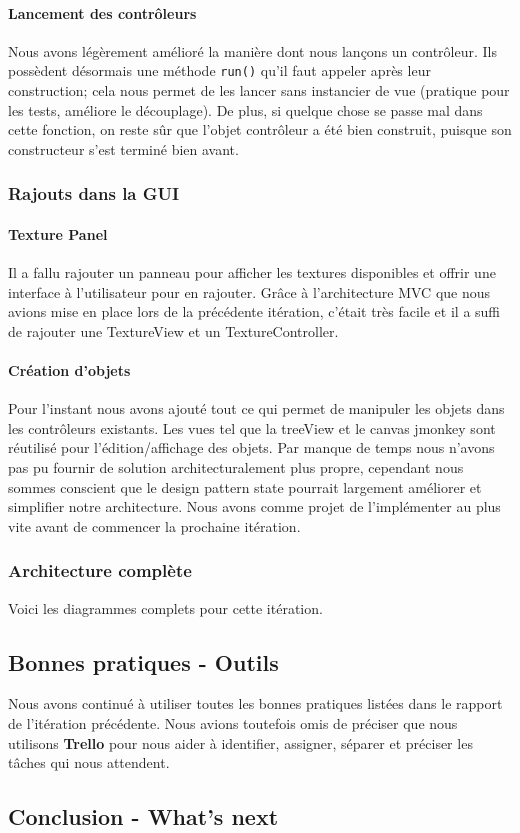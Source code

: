 		\paragraph{Lancement des contrôleurs}
		Nous avons légèrement amélioré la manière dont nous lançons un contrôleur.
		Ils possèdent désormais une méthode \texttt{run()} qu'il faut appeler
		après leur construction; cela nous permet de les lancer sans instancier
		de vue (pratique pour les tests, améliore le découplage). De plus, si 
		quelque chose se passe mal dans cette fonction, on reste sûr que 
		l'objet contrôleur a été bien construit, puisque son constructeur s'est
		terminé bien avant. 

	\subsubsection{Rajouts dans la GUI}

		\paragraph{Texture Panel}
		Il a fallu rajouter un panneau pour afficher les textures disponibles et
		offrir une interface à l'utilisateur pour en rajouter. Grâce à 
		l'architecture MVC que nous avions mise en place lors de la précédente 
		itération, c'était très facile et il a suffi de rajouter une TextureView
		et un TextureController.

		\paragraph{Création d'objets}
		Pour l'instant nous avons ajouté tout ce qui permet de manipuler les objets dans les contrôleurs existants. Les vues tel que la treeView et le canvas jmonkey sont réutilisé pour l'édition/affichage des objets. Par manque de temps nous n'avons pas pu fournir de solution architecturalement plus propre, cependant nous sommes conscient que le design pattern state pourrait largement améliorer et simplifier notre architecture. Nous avons comme projet de l'implémenter au plus vite avant de commencer la prochaine itération.

	\subsubsection{Architecture complète}
	Voici les diagrammes complets pour cette itération.


\subsection{Bonnes pratiques - Outils}

Nous avons continué à utiliser toutes les bonnes pratiques listées dans le
rapport de l'itération précédente. Nous avions toutefois omis de préciser que
nous utilisons \textbf{Trello} pour nous aider à identifier, assigner, séparer 
et préciser les tâches qui nous attendent. 

\subsection{Conclusion - What's next}

